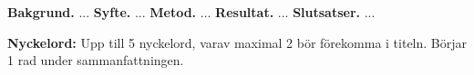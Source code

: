 \sammanfattning
\noindent
\textbf{Bakgrund.} ... \newline
\textbf{Syfte.} ... \newline
\textbf{Metod.} ... \newline
\textbf{Resultat.} ... \newline
\textbf{Slutsatser.} ...

\vspace{1cm}
\noindent
\textbf{Nyckelord:} Upp till 5 nyckelord, varav maximal 2 bör förekomma i titeln. Börjar 1 rad under sammanfattningen.

\cleardoublepage